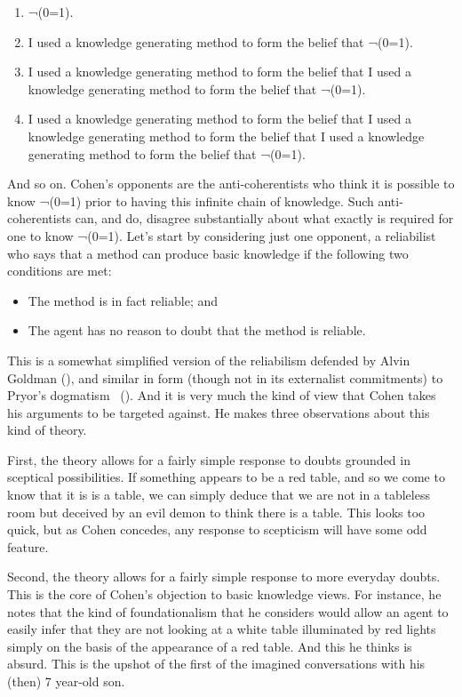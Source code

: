 \documentclass[
  10pt,
  letterpaper,
  twoside]{scrbook}
\providecommand{\tightlist}{%
  \setlength{\itemsep}{0pt}\setlength{\parskip}{0pt}}\usepackage{longtable,booktabs,array}
\begin{document}
\begin{enumerate}
\def\labelenumi{\arabic{enumi}.}
\tightlist
\item
  ¬(0=1).
\item
  I used a knowledge generating method to form the belief that ¬(0=1).
\item
  I used a knowledge generating method to form the belief that I used a
  knowledge generating method to form the belief that ¬(0=1).
\item
  I used a knowledge generating method to form the belief that I used a
  knowledge generating method to form the belief that I used a knowledge
  generating method to form the belief that ¬(0=1).
\end{enumerate}

And so on. Cohen's opponents are the anti-coherentists who think it is
possible to know ¬(0=1) prior to having this infinite chain of
knowledge. Such anti-coherentists can, and do, disagree substantially
about what exactly is required for one to know ¬(0=1). Let's start by
considering just one opponent, a reliabilist who says that a method can
produce basic knowledge if the following two conditions are met:

\begin{itemize}
\tightlist
\item
  The method is in fact reliable; and
\item
  The agent has no reason to doubt that the method is reliable.
\end{itemize}

This is a somewhat simplified version of the reliabilism defended by
Alvin Goldman (), and similar
in form (though not in its externalist commitments) to Pryor's dogmatism
~(). And it is very much the kind of
view that Cohen takes his arguments to be targeted against. He makes
three observations about this kind of theory.

First, the theory allows for a fairly simple response to doubts grounded
in sceptical possibilities. If something appears to be a red table, and
so we come to know that it is is a table, we can simply deduce that we
are not in a tableless room but deceived by an evil demon to think there
is a table. This looks too quick, but as Cohen concedes, any response to
scepticism will have some odd feature.

Second, the theory allows for a fairly simple response to more everyday
doubts. This is the core of Cohen's objection to basic knowledge views.
For instance, he notes that the kind of foundationalism that he
considers would allow an agent to easily infer that they are not looking
at a white table illuminated by red lights simply on the basis of the
appearance of a red table. And this he thinks is absurd. This is the
upshot of the first of the imagined conversations with his (then) 7
year-old son.
\end{document}
